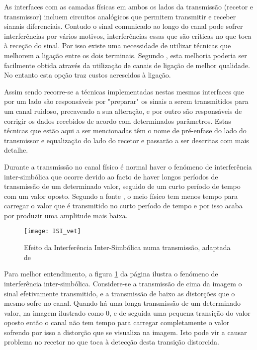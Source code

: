 As interfaces com as camadas físicas em ambos os lados da transmissão (recetor e transmissor) incluem circuitos analógicos que permitem transmitir e receber sianais diferenciais. Contudo o sinal comunicado ao longo do canal pode sofrer interferências por vários motivos, interferências essas que são críticas no que toca à receção do sinal. Por isso existe uma necessidade de utilizar técnicas que melhorem a ligação entre os dois terminais. Segundo \cite{R012}, esta melhoria poderia ser facilmente obtida através da utilização de canais de ligação de melhor qualidade. No entanto esta opção traz custos acrescidos à ligação. 

Assim sendo recorre-se a técnicas implementadas nestas mesmas interfaces que por um lado são responsáveis por "preparar" os sinais a serem transmitidos para um canal ruidoso, precavendo a sua alteração, e por outro são responsáveis de corrigir os dados recebidos de acordo com determinados parâmetros. Estas técnicas que estão aqui a ser mencionadas têm o nome de pré-enfase do lado do transmissor e equalização do lado do recetor e passarão a ser descritas com mais detalhe.

Durante a transmissão no canal físico é normal haver o fenómeno de interferência inter-simbólica que ocorre devido ao facto de haver longos períodos de transmissão de um determinado valor, seguido de um curto período de tempo com um valor oposto. Segundo a fonte \cite{R032}, o meio físico tem menos tempo para carregar o valor que é transmitido no curto período de tempo e por isso acaba por produzir uma amplitude mais baixa.
\begin{figure}[h!]
	\begin{center}
		\leavevmode
		\texttt{[image: ISI\_vet]}
		\caption{Efeito da Interferência Inter-Simbólica numa transmissão, adaptada de \cite{R032}}
		\label{fig:isi}
	\end{center}
\end{figure}
Para melhor entendimento, a figura \ref{fig:isi} da página \pageref{fig:isi} ilustra o fenómeno de interferência inter-simbólica. Considere-se a transmissão de cima da imagem o sinal efetivamente transmitido, e a transmissão de baixo as distorções que o mesmo sofre no canal. Quando há uma longa transmissão de um determinado valor, na imagem ilustrado como 0, e de seguida uma pequena transição do valor oposto então o canal não tem tempo para carregar completamente o valor sofrendo por isso a distorção que se visualiza na imagem. Isto pode vir a causar problema no recetor no que toca à detecção desta transição distorcida.

